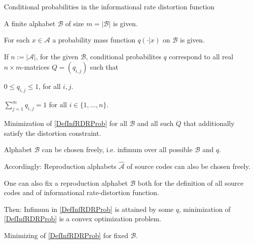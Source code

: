 \begin{frame}{Conditional probabilities in the informational rate distortion function} 

\bit 
\item A finite alphabet $\mathcal{B}$ of size $m=|\mathcal{B}|$ is given. 
\item For each $x\in\mathcal{A}$ a probability mass function $q(\cdot|x)$  on $\mathcal{B}$ is given. 
\item If  $n:=|\mathcal{A}|$, for the given $\mathcal{B}$, conditional probabilites  $q$ correspond to all real $n\times m$-matrices $Q=(q_{i,j})$ such that 
\bit
\item $0 \leq q_{i,j} \leq 1$, for all $i,j$. 
\item $\sum_{j=1}^mq_{i,j}=1$ for all $i\in\{1,\dots,n\}$. 
\eit
\item[\iarrow] Minimization of \eqref{DefInfRDRProb} for all $\mathcal{B}$ and all such $Q$ that additionally satisfy the distortion constraint.
\item Alphabet $\mathcal{B}$ can be chosen freely, i.e. infimum over all possible $\mathcal{B}$ and $q$. 
\item Accordingly: Reproduction alphabets $\widehat{\mathcal{A}}$ of source codes can also be chosen freely.  
\item One can also fix a reproduction alphabet $\mathcal{B}$ both for the definition of all source codes and of informational rate-distortion function.  
\item Then: Infimum in \eqref{DefInfRDRProb}  is attained by some $q$, minimization of \eqref{DefInfRDRProb} is a convex optimization problem.
\item[\iarrow]  Minimizing of \eqref{DefInfRDRProb} for fixed $\mathcal{B}$.  
\eit 
\end{frame}

